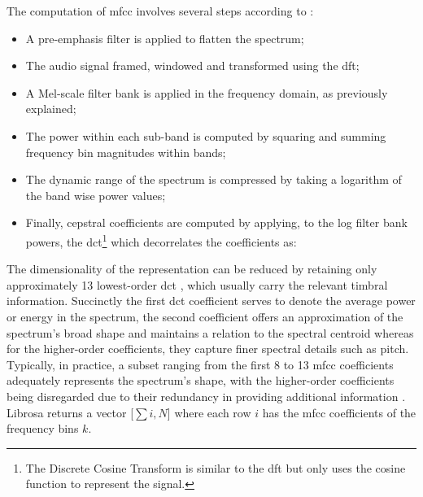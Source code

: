 The computation of \gls{mfcc} involves several steps according to \textcite{Klapuri2006}:%

\begin{itemize}
    \item A pre-emphasis filter is applied to flatten the spectrum;
    \item The audio signal framed, windowed and transformed using the \gls{dft};
    \item A Mel-scale filter bank is applied in the frequency domain, as previously explained;
    \item The power within each sub-band is computed by squaring and summing frequency bin magnitudes within bands;
    \item The dynamic range of the spectrum is compressed by taking a logarithm of the band wise power values;
    \item Finally, cepstral coefficients are computed by applying, to the log filter bank powers, the \gls{dct}\footnote{The Discrete Cosine Transform is similar to the \gls{dft} but only uses the cosine function to represent the signal.} which decorrelates the coefficients as:
\end{itemize}


The dimensionality of the representation can be reduced by retaining only approximately 13 lowest-order \gls{dct}%
, which usually carry the relevant timbral information. Succinctly the first \gls{dct} coefficient serves to denote the average power or energy in the spectrum, the second coefficient offers an approximation of the spectrum's broad shape and maintains a relation to the spectral centroid whereas for the higher-order coefficients, they capture finer spectral details such as pitch. Typically, in practice, a subset ranging from the first 8 to 13 \gls{mfcc} coefficients adequately represents the spectrum's shape, with the higher-order coefficients being disregarded due to their redundancy in providing additional information \cite{Abreha2014}. Librosa \cite{McFee2015librosa_sw} returns a vector [$\sum i, N$] where each row $i$ has the \gls{mfcc} coefficients of the frequency bins $k$.

